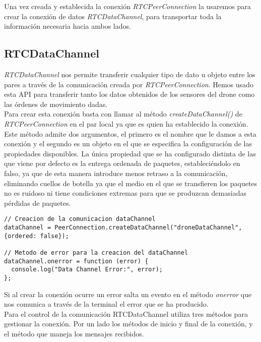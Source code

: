Una vez creada y establecida la conexión \emph{RTCPeerConnection} la usaremos para crear la conexión de datos \emph{RTCDataChannel}, para transportar toda la información necesaria hacia ambos lados.\\


\subsection{RTCDataChannel}

\emph{RTCDataChannel} nos permite transferir cualquier tipo de dato u objeto entre los pares a través de la comunicación creada por \emph{RTCPeerConnection}. Hemos usado esta API para transferir tanto los datos obtenidos de los sensores del drone como las órdenes de movimiento dadas.\\

Para crear esta conexión basta con llamar al método \emph{createDataChannel()} de \emph{RTCPeerConnection} en el par local ya que es quien ha establecido la conexión. Este método admite dos argumentos, el primero es el nombre que le damos a esta conexión y el segundo es un objeto en el que se especifica la configuración de las propiedades disponibles. La única propiedad que se ha configurado distinta de las que viene por defecto es la entrega ordenada de paquetes, estableciéndolo en falso, ya que de esta manera introduce menos retraso a la comunicación, eliminando cuellos de botella ya que el medio en el que se transfieren los paquetes no es ruidoso ni tiene condiciones extremas para que se produzcan demasiadas pérdidas de paquetes.\\

\begin{lstlisting}[caption=Establecimiento conexión RTCDataChannlel en el par local.]
// Creacion de la comunicacion dataChannel
dataChannel = PeerConnection.createDataChannel("droneDataChannel", {ordered: false});

// Metodo de error para la creacion del dataChannel
dataChannel.onerror = function (error) {
  console.log("Data Channel Error:", error);
};\end{lstlisting}

Si al crear la conexión ocurre un error salta un evento en el método \emph{onerror} que nos comunica a través de la terminal el error que se ha producido.\\

Para el control de la comunicación RTCDataChannel utiliza tres métodos para gestionar la conexión. Por un lado los métodos de inicio y final de la conexión, y el método que maneja los mensajes recibidos.\\

